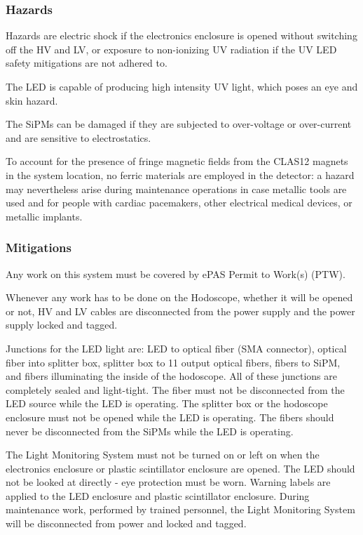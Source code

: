 \subsubsection{Hazards} 

Hazards are electric shock if the electronics enclosure is opened without switching off the 
HV and LV, or exposure to non-ionizing UV radiation if the UV LED safety mitigations are not 
adhered to.

The LED is capable of producing high intensity UV light, which poses an eye and skin hazard. 

The SiPMs can be damaged if they are subjected to over-voltage or over-current and are sensitive 
to electrostatics.

To account for the presence of fringe magnetic fields from the CLAS12 magnets in the system 
location, no ferric materials are employed in the detector: a hazard may nevertheless arise 
during maintenance operations in case metallic tools are used and for people with cardiac 
pacemakers, other electrical medical devices, or metallic implants.

\subsubsection{Mitigations}
Any work on this system must be covered by ePAS Permit to Work(s) (PTW).

Whenever any work has to be done on the Hodoscope, whether it will be opened or not, HV and 
LV cables are disconnected from the power supply and the power supply locked and tagged.

Junctions for the LED light are: LED to optical fiber (SMA connector), optical fiber into 
splitter box, splitter box to 11 output optical fibers, fibers to SiPM, and fibers illuminating 
the inside of the hodoscope. All of these junctions are completely sealed and light-tight. The 
fiber must not be disconnected from the LED source while the LED is operating. The splitter box 
or the hodoscope enclosure must not be opened while the LED is operating. The fibers should 
never be disconnected from the SiPMs while the LED is operating. 

The Light Monitoring System must not be turned on or left on when the electronics enclosure 
or plastic scintillator enclosure are opened. The LED should not be looked at directly - eye 
protection must be worn. Warning labels are applied to the LED enclosure and plastic 
scintillator enclosure.  During maintenance work, performed by trained personnel, the Light 
Monitoring System will be disconnected from power and locked and tagged.

